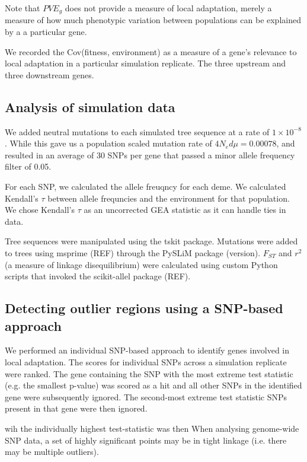\documentclass[11pt,twoside,lineno]{GSA_format}
\begin{document}
Note that $PVE_g$ does not provide a measure of local adaptation, merely a measure of how much phenotypic variation between populations can be explained by a a particular gene. 

We recorded the Cov(fitness, environment) as a measure of a gene's relevance to local adaptation in a particular simulation replicate. The three upstream and three downstream genes.


\subsection{Analysis of simulation data}

We added neutral mutations to each simulated tree sequence at a rate of $1\times10^{-8}$. While this gave us a population scaled mutation rate of $4N_ed\mu = 0.00078$, and resulted in an average of 30 SNPs per gene that passed a minor allele frequency filter of 0.05.



For each SNP, we calculated the allele freuqncy for each deme. We calculated Kendall's $\tau$ between allele frequncies and the environment for that population.  We chose Kendall's $\tau$ as an uncorrected GEA statistic as it can handle ties in data. 

Tree sequences were manipulated using the tskit package. Mutations were added to trees using msprime (REF) through the PySLiM package (version). $F_{ST}$ and $r^2$ (a measure of linkage disequilibrium) were calculated using custom Python scripts that invoked the scikit-allel package (REF).

\subsection{Detecting outlier regions using a SNP-based approach}

We performed an individual SNP-based approach to identify genes involved in local adaptation. The scores for individual SNPs across a simulation replicate were ranked. The gene containing the SNP with the most extreme test statistic (e.g. the smallest p-value) was scored as a hit and all other SNPs in the identified gene were subsequently ignored. The second-most extreme test statistic SNPs present in that gene were then ignored. 

wih the individually highest test-statistic was then
When analysing genome-wide SNP data, a set of highly significant points may be in tight linkage (i.e. there may be multiple outliers). 
\end{document}
